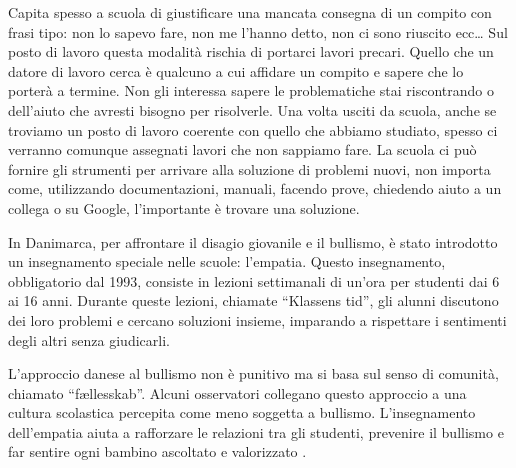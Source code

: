 \documentclass[12pt]{book} %
\begin{document}
Capita spesso a scuola di giustificare una mancata consegna di un compito con frasi tipo: non lo sapevo fare, non me
l'hanno detto, non ci sono riuscito ecc… Sul posto di lavoro questa modalità rischia di portarci lavori precari. Quello che un datore di lavoro cerca è qualcuno a cui affidare un compito e sapere che lo porterà a termine.
Non gli interessa sapere le problematiche stai riscontrando o dell'aiuto che avresti bisogno per risolverle. Una
volta usciti da scuola, anche se troviamo un posto di lavoro coerente con
quello che abbiamo studiato, spesso ci verranno comunque assegnati lavori che non sappiamo fare. La scuola ci può fornire gli strumenti per
arrivare alla soluzione di problemi nuovi, non importa come, utilizzando documentazioni, manuali, facendo prove,
chiedendo aiuto a un collega o su Google, l'importante è trovare una soluzione. 

\begin{mdframed}[linewidth=1pt]
In Danimarca, per affrontare il disagio giovanile e il bullismo, è stato introdotto un insegnamento speciale nelle scuole: l’empatia. Questo insegnamento, obbligatorio dal 1993, consiste in lezioni settimanali di un’ora per studenti dai 6 ai 16 anni. Durante queste lezioni, chiamate “Klassens tid”, gli alunni discutono dei loro problemi e cercano soluzioni insieme, imparando a rispettare i sentimenti degli altri senza giudicarli.

L’approccio danese al bullismo non è punitivo ma si basa sul senso di comunità, chiamato “fællesskab”. Alcuni osservatori collegano questo approccio a una cultura scolastica percepita come meno soggetta a bullismo. L’insegnamento dell’empatia aiuta a rafforzare le relazioni tra gli studenti, prevenire il bullismo e far sentire ogni bambino ascoltato e valorizzato    .
\end{mdframed}
\end{document}
